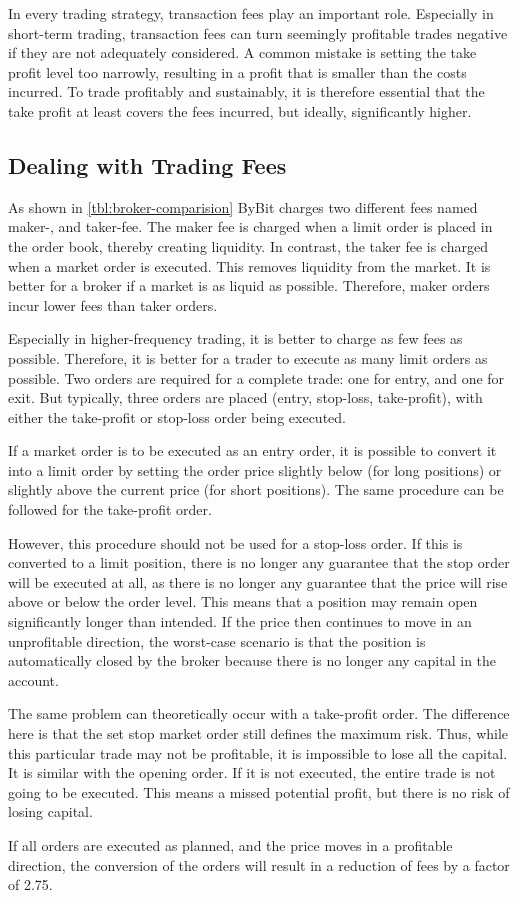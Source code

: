 In every trading strategy, transaction fees play an important role.
Especially in short-term trading, transaction fees can turn seemingly profitable trades negative if they are not adequately considered.
A common mistake is setting the take profit level too narrowly, resulting in a profit that is smaller than the costs incurred.
To trade profitably and sustainably, it is therefore essential that the take profit at least covers the fees incurred, but ideally, significantly higher.

\subsection{Dealing with Trading Fees}
\label{chap:dealing-with-trading-fees}

As shown in \autoref{tbl:broker-comparision} ByBit charges two different fees named maker-, and taker-fee.
The maker fee is charged when a limit order is placed in the order book, thereby creating liquidity.
In contrast, the taker fee is charged when a market order is executed.
This removes liquidity from the market.
It is better for a broker if a market is as liquid as possible.
Therefore, maker orders incur lower fees than taker orders.

Especially in higher-frequency trading, it is better to charge as few fees as possible.
Therefore, it is better for a trader to execute as many limit orders as possible.
Two orders are required for a complete trade: one for entry, and one for exit.
But typically, three orders are placed (entry, stop-loss, take-profit), with either the take-profit or stop-loss order being executed.

If a market order is to be executed as an entry order, it is possible to convert it into a limit order by setting the order price slightly below (for long positions) or slightly above the current price (for short positions).
The same procedure can be followed for the take-profit order.

However, this procedure should not be used for a stop-loss order.
If this is converted to a limit position, there is no longer any guarantee that the stop order will be executed at all, as there is no longer any guarantee that the price will rise above or below the order level.
This means that a position may remain open significantly longer than intended.
If the price then continues to move in an unprofitable direction, the worst-case scenario is that the position is automatically closed by the broker because there is no longer any capital in the account.

The same problem can theoretically occur with a take-profit order.
The difference here is that the set stop market order still defines the maximum risk.
Thus, while this particular trade may not be profitable, it is impossible to lose all the capital.
It is similar with the opening order.
If it is not executed, the entire trade is not going to be executed.
This means a missed potential profit, but there is no risk of losing capital.

If all orders are executed as planned, and the price moves in a profitable direction, the conversion of the orders will result in a reduction of fees by a factor of 2.75.